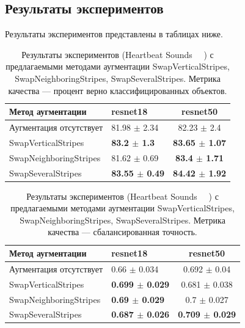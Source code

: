 \documentclass[12pt, fleqn]{article}
\begin{document}
\subsection{Результаты экспериментов}

Результаты экспериментов представлены в таблицах ниже.
\begin{table}[ht!]
    \centering
	\begin{tabular}{| l | l | c |}
    	\hline
	    Метод аугментации & resnet18 & resnet50 \\ \hline
	    Аугментация отсутствует  & 81.98 $\pm$ 2.34 & 82.23 $\pm$ 2.4 \\ \hline
	    SwapVerticalStripes & \textbf{83.2 $\pm$ 1.3} & \textbf{83.65 $\pm$ 1.07} \\ \hline
	    SwapNeighboringStripes & 81.62 $\pm$ 0.69 & \textbf{83.4 $\pm$ 1.71} \\ \hline
	    SwapSeveralStripes & \textbf{83.55 $\pm$ 0.49} & \textbf{84.42 $\pm$ 1.92} \\ \hline
	\end{tabular}
	\caption{Результаты экспериментов (Heartbeat Sounds ~\cite{HeartbeatSoundsArticle}~\cite{HeartbeatSoundsKaggle}) с предлагаемыми методами аугментации SwapVerticalStripes, SwapNeighboringStripes, SwapSeveralStripes. Метрика качества --- процент верно классифицированных объектов.}
	\label{table:lukianov_pavel_t1}
\end{table}

\begin{table}[ht!]
    \centering
	\begin{tabular}{| l | l | c |}
    	\hline
	    Метод аугментации & resnet18 & resnet50 \\ \hline
	    Аугментация отсутствует  & 0.66 $\pm$ 0.034 & 0.692 $\pm$ 0.04 \\ \hline
	    SwapVerticalStripes & \textbf{0.699 $\pm$ 0.029} & 0.681 $\pm$ 0.038 \\ \hline
	    SwapNeighboringStripes & \textbf{0.69 $\pm$ 0.029} & 0.7 $\pm$ 0.027 \\ \hline
	    SwapSeveralStripes & \textbf{0.687 $\pm$ 0.026} & \textbf{0.709 $\pm$ 0.029} \\ \hline
	\end{tabular}
	\caption{Результаты экспериментов (Heartbeat Sounds ~\cite{HeartbeatSoundsArticle}~\cite{HeartbeatSoundsKaggle}) с предлагаемыми методами аугментации SwapVerticalStripes, SwapNeighboringStripes, SwapSeveralStripes. Метрика качества --- сбалансированная точность.}
	\label{table:lukianov_pavel_t1}
\end{table}
\end{document}

